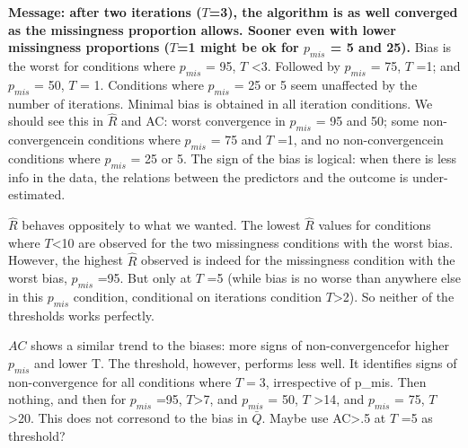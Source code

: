 \documentclass[Royal,times,sageh]{sagej}
\begin{document}
\textbf{Message: after two iterations (\(T\)=3), the algorithm is as well converged as the missingness proportion allows. Sooner even with lower missingness proportions (\(T\)=1 might be ok for \(p_{mis}\) = 5 and 25).} Bias is the worst for conditions where \(p_{mis}\) = 95, \(T\) \textless3. Followed by \(p_{mis}\) = 75, \(T\) =1; and \(p_{mis}\) = 50, \(T\) = 1. Conditions where \(p_{mis}\) = 25 or 5 seem unaffected by the number of iterations. Minimal bias is obtained in all iteration conditions. We should see this in \(\widehat{R}\) and AC: worst convergence in \(p_{mis}\) = 95 and 50; some non-convergencein conditions where \(p_{mis}\) = 75 and \(T\) =1, and no non-convergencein conditions where \(p_{mis}\) = 25 or 5. The sign of the bias is logical: when there is less info in the data, the relations between the predictors and the outcome is under-estimated.

\(\widehat{R}\) behaves oppositely to what we wanted. The lowest \(\widehat{R}\) values for conditions where \(T\)\textless10 are observed for the two missingness conditions with the worst bias. However, the highest \(\widehat{R}\) observed is indeed for the missingness condition with the worst bias, \(p_{mis}\) =95. But only at \(T\) =5 (while bias is no worse than anywhere else in this \(p_{mis}\) condition, conditional on iterations condition \(T\)\textgreater2). So neither of the thresholds works perfectly.

\(AC\) shows a similar trend to the biases: more signs of non-convergencefor higher \(p_{mis}\) and lower T. The threshold, however, performs less well. It identifies signs of non-convergence for all conditions where \(T=3\), irrespective of p\_mis. Then nothing, and then for \(p_{mis}\) =95, \(T\)\textgreater7, and \(p_{mis}\) = 50, \(T\) \textgreater14, and \(p_{mis}\) = 75, \(T\)\textgreater20. This does not corresond to the bias in \(\bar{Q}\). Maybe use AC\textgreater.5 at \(T\) =5 as threshold?
\end{document}
